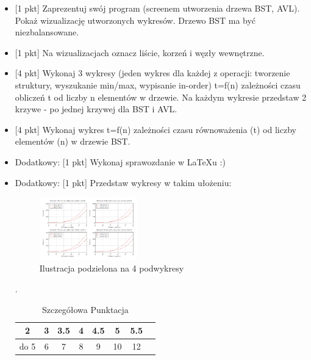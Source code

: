 \begin{itemize}[label={}]
\item \textcolor{PUT-Blue}{[1 pkt]} Zaprezentuj swój program (screenem utworzenia drzewa BST, AVL). Pokaż wizualizację utworzonych wykresów. Drzewo BST ma być niezbalansowane.  

\item \textcolor{PUT-Blue}{[1 pkt]} Na wizualizacjach oznacz liście, korzeń i węzły wewnętrzne.

\item \textcolor{PUT-Blue}{[4 pkt]} Wykonaj 3 wykresy (jeden wykres dla każdej z operacji: tworzenie struktury, wyszukanie min/max, wypisanie in-order) t=f(n) zależności czasu obliczeń t od liczby n elementów w drzewie. Na każdym wykresie przedstaw 2 krzywe - po jednej krzywej dla BST i AVL. 

\item \textcolor{PUT-Blue}{[4 pkt]} Wykonaj wykres t=f(n) zależności czasu równoważenia (t) od liczby elementów (n) w drzewie BST.

\item \textcolor{PUT-Blue}{Dodatkowy: [1 pkt]} Wykonaj sprawozdanie w LaTeXu :)

\item \textcolor{PUT-Blue}{Dodatkowy: [1 pkt]} Przedstaw wykresy w takim ułożeniu:

\begin{figure}[H]
    \centering
    \includegraphics[width=0.4\textwidth]{Figures/Plots.png} 
    \caption{Ilustracja podzielona na 4 podwykresy}
    \label{fig:tree:rebalance:phase1}
\end{figure}

.
\begin{table}[H]
    \centering
    \begin{tabular}{|c|c|c|c|c|c|c|c|} \hline
         2 & 3     & 3.5   & 4     & 4.5   & 5   & 5.5      \\ \hline
      do 5 & 6     &     7  &    8  & 9     & 10 & 12 \\ \hline
    \end{tabular}
    \caption{Szczegółowa Punktacja}
    \label{tab:my_label}
\end{table}


\end{itemize}

